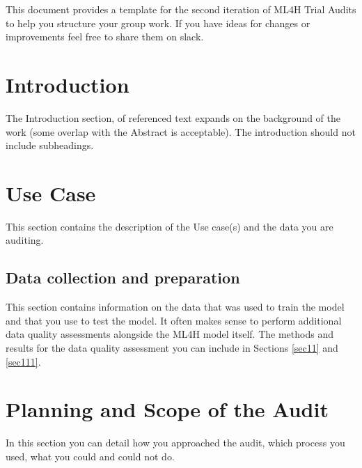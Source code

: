 \documentclass[ml4h-mathphys]{ml4h-jnl}%
\theoremstyle{thmstyleone}%
\theoremstyle{thmstyletwo}%
\theoremstyle{thmstylethree}%
\begin{document}
This document provides a template for the second iteration of ML4H Trial Audits to help you structure your group work. If you have ideas for changes or improvements feel free to share them on slack.

\section{Introduction}\label{sec1}

The Introduction section, of referenced text \cite{bib1} expands on the background of the work (some overlap with the Abstract is acceptable). The introduction should not include subheadings.

\section{Use Case}
This section contains the description of the Use case(s) and the data you are auditing.

\subsection{Data collection and preparation}
This section contains information on the data that was used to train the model and that you use to test the model. It often makes sense to perform additional data quality assessments alongside the ML4H model itself. The methods and results for the data quality assessment you can include in Sections \ref{sec11} and \ref{sec111}.

\section{Planning and Scope of the Audit}
In this section you can detail how you approached the audit, which process you used, what you could and could not do.
\end{document}
